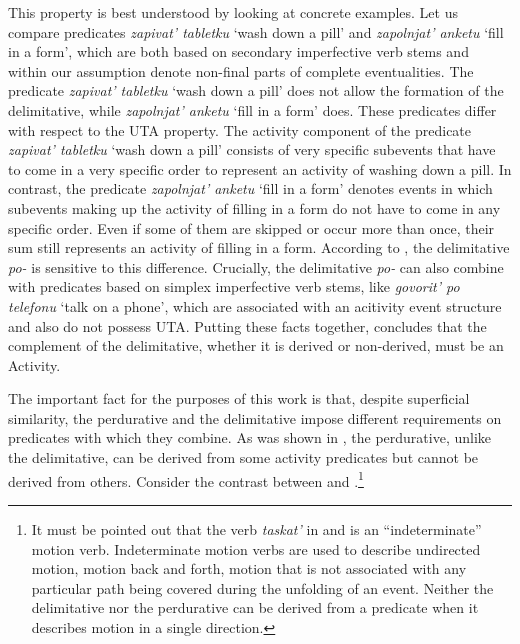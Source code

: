 \documentclass[output=paper,
]{langscibook}
\begin{document}
\noindent This property is best understood by looking at concrete examples. Let us compare predicates \textit{zapivat’ tabletku} `wash down a pill' and \textit{zapolnjat’ anketu} `fill in a form', which are both based on secondary imperfective verb stems and within our assumption denote non-final parts of complete eventualities. The predicate \textit{zapivat’ tabletku} `wash down a pill' does not allow the formation of the delimitative, while \textit{zapolnjat’ anketu} `fill in a form' does. These predicates differ with respect to the UTA property. The activity component of the predicate \textit{zapivat’ tabletku} `wash down a pill' consists of very specific subevents that have to come in a very specific order to represent an activity of washing down a pill. In contrast, the predicate \textit{zapolnjat’ anketu} `fill in a form' denotes events in which subevents making up the activity of filling in a form do not have to come in any specific order. Even if some of them are skipped or occur more than once, their sum still represents an activity of filling in a form. According to \citet{tatevosov2017temporal}, the delimitative \textit{po-} is sensitive to this difference. Crucially, the delimitative \textit{po-} can also combine with predicates based on simplex imperfective verb stems, like \textit{govorit’ po telefonu} `talk on a phone', which are associated with an acitivity event structure and also do not possess UTA. Putting these facts together, \citet{tatevosov2017temporal} concludes that the complement of the delimitative, whether it is derived or non-derived, must be an Activity.

The important fact for the purposes of this work is that, despite superficial similarity, the perdurative and the delimitative impose different requirements on predicates with which they combine. As was shown in , the perdurative, unlike the delimitative, can be derived from some activity predicates but cannot be derived from others. Consider the contrast between  and .\footnote{It must be pointed out that the verb \textit{taskat’} in  and  is an ``indeterminate'' motion verb. Indeterminate motion verbs are used to describe undirected motion, motion back and forth, motion that is not associated with any particular path being covered during the unfolding of an event. Neither the delimitative nor the perdurative can be derived from a predicate when it describes motion in a single direction.}

\ea \label{ex:naumov:23} 
\z \z
\end{document}
